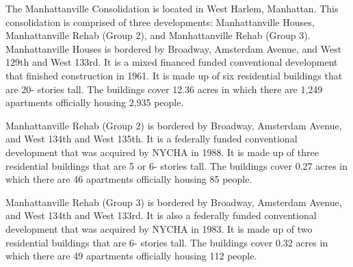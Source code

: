    

 

The Manhattanville Consolidation is located in West Harlem, Manhattan. This consolidation is comprised of three developments: Manhattanville Houses, Manhattanville Rehab (Group 2), and Manhattanville Rehab (Group 3). Manhattanville Houses is bordered by Broadway, Amsterdam Avenue, and West 129th and West 133rd. It is a mixed financed funded conventional development that finished construction in 1961. It is made up of six residential buildings that are 20- stories tall. The buildings cover 12.36 acres in which there are 1,249 apartments officially housing 2,935 people.    

   

Manhattanville Rehab (Group 2) is bordered by Broadway, Amsterdam Avenue, and West 134th and West 135th. It is a federally funded conventional development that was acquired by NYCHA in 1988. It is made up of three residential buildings that are 5 or 6- stories tall. The buildings cover 0.27 acres in which there are 46 apartments officially housing 85 people.    

Manhattanville Rehab (Group 3) is bordered by Broadway, Amsterdam Avenue, and West 134th and West 133rd. It is also a federally funded conventional development that was acquired by NYCHA in 1983. It is made up of two residential buildings that are 6- stories tall. The buildings cover 0.32 acres in which there are 49 apartments officially housing 112 people.        
